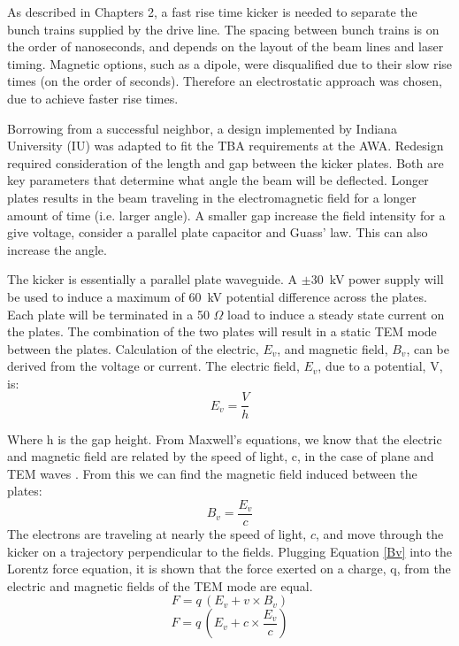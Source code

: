 
As described in Chapters 2, a fast rise time kicker is needed to separate the 
bunch trains supplied by the drive line. The spacing between bunch trains is on the 
order of nanoseconds, and depends on the layout of the beam lines and laser timing.
Magnetic options, such as a dipole, were disqualified due to their slow rise times 
(on the order of seconds). 
Therefore an electrostatic approach was chosen, due to achieve faster rise times.

Borrowing from a successful neighbor, a design implemented by Indiana University (IU) \cite{iukicker}
was adapted to fit the TBA requirements at the AWA. Redesign required consideration
of the length and gap between the kicker plates. Both are key parameters that determine 
what angle the beam will be deflected. Longer plates results in the beam traveling 
in the electromagnetic field for a longer amount of time (i.e. larger angle). 
A smaller gap increase the field intensity for a give voltage, consider a parallel plate 
capacitor and Guass' law. This can also increase the angle.


The kicker is essentially a parallel plate waveguide. 
A $\pm$\SI{30}{kV} power supply will be used to induce a maximum of \SI{60}{kV} potential difference 
across the plates. Each plate will be terminated in a 50 $\Omega$ load to induce a steady 
state current on the plates. The combination of the two plates will result in a static TEM mode 
between the plates. Calculation of the electric, $E_v$, and magnetic field, $B_v$,
can be derived from the voltage or current. The electric field, $E_v$, due to a potential, V, is: 
\begin{equation}
E_v=\frac{V}{h}
\end{equation}

Where h is the gap height. From Maxwell's equations, we know that the electric and magnetic 
field are related by the speed of light, c, in the case of plane and TEM waves \cite{pozar}. 
From this we can find the magnetic field induced between the plates: 
\begin{equation}
B_v=\frac{E_v}{c}
\end{equation}\label{Bv}
The electrons are traveling at nearly the speed of light, $c$, and move through the kicker on a 
trajectory perpendicular to the fields.  Plugging Equation \ref{Bv} into the Lorentz force equation, 
it is shown that the force exerted on a charge, q, 
from the electric and magnetic fields of the TEM mode are equal. 
\begin{equation}
F=q\,(E_v+v\times B_v)
\end{equation}
\begin{equation}
	F = q \,\left(E_v+c\times \frac{E_v}{c}\right)
\end{equation}

